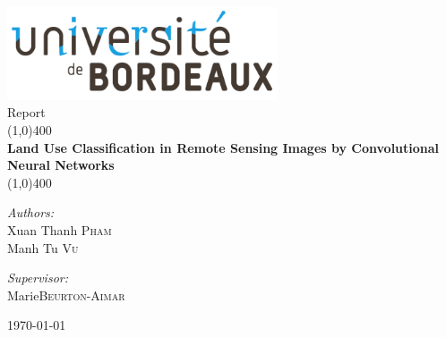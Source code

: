 \usepackage[margin=1in,left=1.5in,includefoot]{geometry}
\usepackage{graphicx}
\usepackage{float}
\usepackage[hyphens]{url}
\usepackage{hyperref}

\usepackage{fancyhdr}
\pagestyle{fancy}
\fancyfoot{}
\fancyhead[LE,RO]{\bfseries\thepage}
\setlength{\headheight}{15pt}

\usepackage[utf8]{inputenc}

\usepackage{color}  
\usepackage{hyperref}
\hypersetup{
    colorlinks=true, %
    linktoc=all,     %
    linkcolor=black,  %
    urlcolor=blue
}


\begin{titlepage}
	\begin{center}
\includegraphics[width=0.6\textwidth]{images/bordeaux.png}\\[1cm]


{\large Report}\\[0.5cm]	
	
	\line(1,0){400}\\[0.2in]
	\huge{\bfseries Land Use Classification in Remote Sensing Images by Convolutional Neural Networks}\\
	\line(1,0){400}\\[1.5cm]
	
	\noindent	
	
	\begin{minipage}[t]{0.4\textwidth}
		\begin{flushleft} \large
    	\emph{Authors:}\\
    	Xuan Thanh \textsc{Pham}\\
    	Manh Tu \textsc{Vu}
		\end{flushleft}
	\end{minipage}
	\begin{minipage}[t]{0.4\textwidth}
  		\begin{flushright} \large
    		\emph{Supervisor:} \\
    		Marie\textsc{Beurton-Aimar}
  		\end{flushright}
	\end{minipage}
	
	\vfill

{\large \today}
	\end{center}
\end{titlepage}


